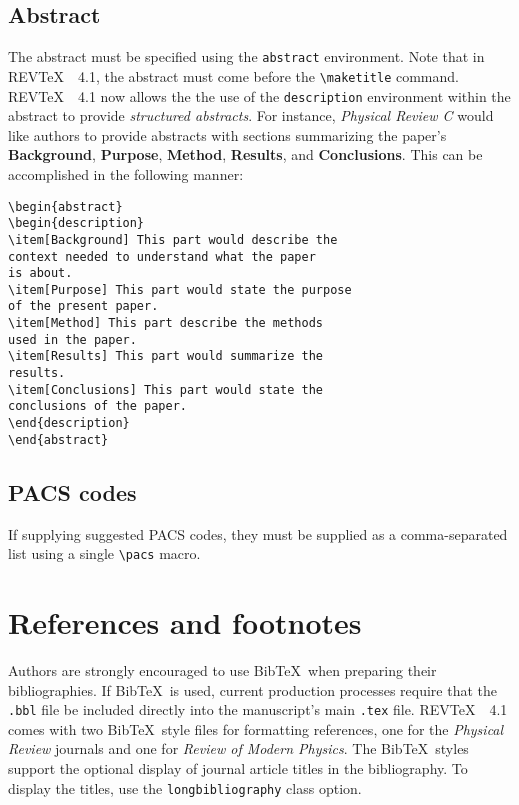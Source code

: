\documentclass[twocolumn,secnumarabic,amssymb, nobibnotes, aps, prd]{revtex4-1}
\newcommand{\revtex}{REV\TeX\ }
\newcommand{\macro}[1]{\texttt{\textbackslash#1}}
\newcommand{\m}[1]{\macro{#1}}
\newcommand{\env}[1]{\texttt{#1}}
\begin{document}
\subsection{Abstract}
The abstract must be specified using the \env{abstract}
environment. Note that in \revtex\ 4.1, the abstract must come before
the \m{maketitle} command. \revtex\ 4.1 now allows the the use of the \env{description}
environment within the abstract to provide \textit{structured abstracts}. For instance, \textit{Physical Review C} would like authors to provide abstracts with sections summarizing the paper's  \textbf{Background}, \textbf{Purpose}, \textbf{Method}, \textbf{Results}, and \textbf{Conclusions}. This can be accomplished in the following manner:
\begin{verbatim}
\begin{abstract}
\begin{description}
\item[Background] This part would describe the
context needed to understand what the paper
is about.
\item[Purpose] This part would state the purpose
of the present paper.
\item[Method] This part describe the methods
used in the paper.
\item[Results] This part would summarize the
results.
\item[Conclusions] This part would state the
conclusions of the paper.
\end{description}
\end{abstract}
\end{verbatim}


\subsection{PACS codes}
If supplying suggested PACS codes, they must be supplied as a
comma-separated list using a single \m{pacs} macro.

\section{References and footnotes}
Authors are strongly encouraged
to use Bib\TeX\ when preparing their bibliographies.  If Bib\TeX\ is used, current production processes
require that the \texttt{.bbl} file be included directly into the
manuscript's main \texttt{.tex} file. \revtex\ 4.1 comes with two Bib\TeX\ style files for formatting
references, one for the \textit{Physical Review} journals and one 
for \textit{Review of Modern Physics}. The Bib\TeX\ styles support the optional display of journal article titles in the bibliography. To display the titles, use the \texttt{longbibliography} class option.
\end{document}
